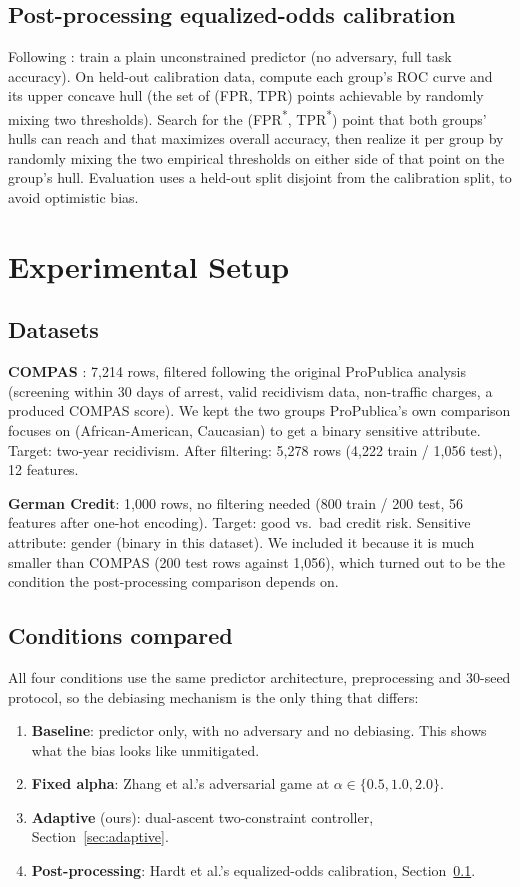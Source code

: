 \documentclass[11pt]{article}
\begin{document}
\subsection{Post-processing equalized-odds calibration}
\label{sec:postproc}
Following \citet{hardt2016equality}: train a plain unconstrained
predictor (no adversary, full task accuracy). On held-out calibration
data, compute each group's ROC curve and its upper concave hull (the set
of (FPR, TPR) points achievable by randomly mixing two thresholds).
Search for the (FPR\textsuperscript{*}, TPR\textsuperscript{*}) point
that both groups' hulls can reach and that maximizes overall accuracy,
then realize it per group by randomly mixing the two empirical
thresholds on either side of that point on the group's hull. Evaluation
uses a held-out split disjoint from the calibration split, to avoid
optimistic bias.

\section{Experimental Setup}

\subsection{Datasets}
\textbf{COMPAS} \citep{angwin2016machine}: 7{,}214 rows, filtered
following the original ProPublica analysis (screening within 30 days of
arrest, valid recidivism data, non-traffic charges, a produced COMPAS
score). We kept the two groups ProPublica's own comparison focuses on
(African-American, Caucasian) to get a binary sensitive attribute.
Target: two-year recidivism. After filtering: 5{,}278 rows
(4{,}222 train / 1{,}056 test), 12 features.

\textbf{German Credit}: 1{,}000 rows, no filtering needed (800 train /
200 test, 56 features after one-hot encoding). Target: good vs.\ bad
credit risk. Sensitive attribute: gender (binary in this dataset).
We included it because it is much smaller than COMPAS (200 test rows
against 1{,}056), which turned out to be the condition the
post-processing comparison depends on.

\subsection{Conditions compared}
All four conditions use the same predictor architecture, preprocessing
and 30-seed protocol, so the debiasing mechanism is the only thing that
differs:
\begin{enumerate}
  \item \textbf{Baseline}: predictor only, with no adversary and no
    debiasing. This shows what the bias looks like unmitigated.
  \item \textbf{Fixed alpha}: Zhang et al.'s adversarial game at
    $\alpha \in \{0.5, 1.0, 2.0\}$.
  \item \textbf{Adaptive} (ours): dual-ascent two-constraint controller,
    Section~\ref{sec:adaptive}.
  \item \textbf{Post-processing}: Hardt et al.'s equalized-odds
    calibration, Section~\ref{sec:postproc}.
\end{enumerate}
\end{document}
